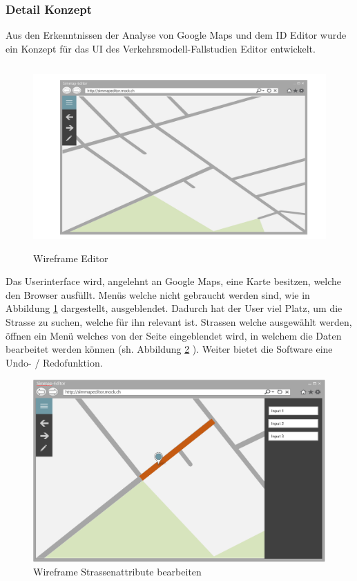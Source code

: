 \subsubsection{Detail Konzept}
Aus den Erkenntnissen der Analyse von Google Maps und dem ID Editor wurde ein Konzept für das UI des Verkehrsmodell-Fallstudien Editor entwickelt.
\begin{figure}[H]
\centering
\includegraphics[height=7cm]{images/KonzeptUI.png}
\caption{Wireframe Editor}
\label{fig:conceptui}
\end{figure}
\noindent
Das Userinterface wird, angelehnt an Google Maps, eine Karte besitzen, welche den Browser ausfüllt. Menüs welche nicht gebraucht werden sind, wie in Abbildung \ref{fig:conceptui}  dargestellt, ausgeblendet. Dadurch hat der User viel Platz, um die Strasse zu suchen, welche für ihn relevant ist. Strassen welche ausgewählt werden, öffnen ein Menü welches von der Seite eingeblendet wird, in welchem die Daten bearbeitet werden können (sh. Abbildung \ref{fig:concepteditStreet} ). Weiter bietet die Software eine Undo- / Redofunktion.
\begin{figure}[H]
\centering
\includegraphics[height=7cm]{images/KonzeptEditStreet.png}
\caption{Wireframe Strassenattribute bearbeiten}
\label{fig:concepteditStreet}
\end{figure}
